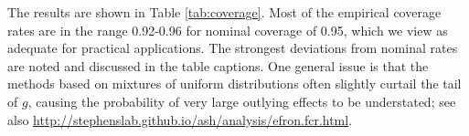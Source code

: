 \documentclass[11pt]{article}
\begin{document}
The results are shown in Table \ref{tab:coverage}.  Most of the empirical coverage rates are in the range 0.92-0.96 for nominal coverage of 0.95, which we view
as adequate for practical applications. The strongest deviations from nominal rates are noted and discussed in the table captions.
One general issue is that the methods based on mixtures of uniform distributions often slightly curtail the tail of $g$, causing the probability of very large outlying effects to be understated;  see also \url{http://stephenslab.github.io/ash/analysis/efron.fcr.html}. 




\end{document}
